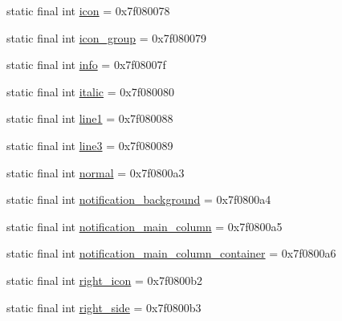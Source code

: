 \begin{DoxyCompactItemize}
\item 
static final int \mbox{\hyperlink{classandroid_1_1support_1_1graphics_1_1drawable_1_1animated_1_1R_1_1id_a77529580b328ea7aef9b76a6fad610d3}{icon}} = 0x7f080078
\item 
static final int \mbox{\hyperlink{classandroid_1_1support_1_1graphics_1_1drawable_1_1animated_1_1R_1_1id_a7ae6c60eb608d0fe4c73be06448f5ab1}{icon\+\_\+group}} = 0x7f080079
\item 
static final int \mbox{\hyperlink{classandroid_1_1support_1_1graphics_1_1drawable_1_1animated_1_1R_1_1id_ae5aa434b06cb587ead5acd71185c5950}{info}} = 0x7f08007f
\item 
static final int \mbox{\hyperlink{classandroid_1_1support_1_1graphics_1_1drawable_1_1animated_1_1R_1_1id_a4fb8020db5e8977280ad64dabf07c71b}{italic}} = 0x7f080080
\item 
static final int \mbox{\hyperlink{classandroid_1_1support_1_1graphics_1_1drawable_1_1animated_1_1R_1_1id_afa559e41bf985dcd29a2ad25fcbe59f4}{line1}} = 0x7f080088
\item 
static final int \mbox{\hyperlink{classandroid_1_1support_1_1graphics_1_1drawable_1_1animated_1_1R_1_1id_a73076872a7ca7bf5ba9b576af783624a}{line3}} = 0x7f080089
\item 
static final int \mbox{\hyperlink{classandroid_1_1support_1_1graphics_1_1drawable_1_1animated_1_1R_1_1id_acb92b999f9407163a809f311a58cf233}{normal}} = 0x7f0800a3
\item 
static final int \mbox{\hyperlink{classandroid_1_1support_1_1graphics_1_1drawable_1_1animated_1_1R_1_1id_a996550cf9174057204f5bdd064f2ec4b}{notification\+\_\+background}} = 0x7f0800a4
\item 
static final int \mbox{\hyperlink{classandroid_1_1support_1_1graphics_1_1drawable_1_1animated_1_1R_1_1id_a33bd9475d425820a04e7cd8b3959dc41}{notification\+\_\+main\+\_\+column}} = 0x7f0800a5
\item 
static final int \mbox{\hyperlink{classandroid_1_1support_1_1graphics_1_1drawable_1_1animated_1_1R_1_1id_a4659cfd56c99a93058be66facd12160d}{notification\+\_\+main\+\_\+column\+\_\+container}} = 0x7f0800a6
\item 
static final int \mbox{\hyperlink{classandroid_1_1support_1_1graphics_1_1drawable_1_1animated_1_1R_1_1id_a5289728033dea722cd93a2a5d2c36ed5}{right\+\_\+icon}} = 0x7f0800b2
\item 
static final int \mbox{\hyperlink{classandroid_1_1support_1_1graphics_1_1drawable_1_1animated_1_1R_1_1id_aa9ac842f968caa43f844db5381d766ba}{right\+\_\+side}} = 0x7f0800b3

\end{DoxyCompactItemize}
